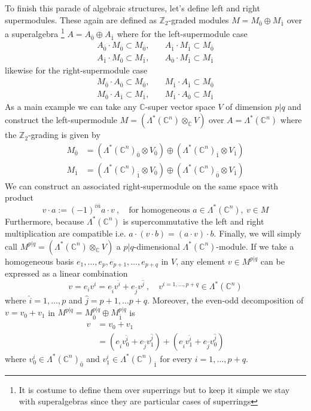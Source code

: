 \documentclass[a4paper,12pt]{article}
\numberwithin{equation}{section}
\numberwithin{thm}{section}
\numberwithin{exm}{section}
\newcommand{\Z}{{\mathbb Z}}
\newcommand{\C}{{\mathbb C}}
\newcommand{\<}{{\langle}}
\renewcommand{\>}{{\rangle}}
\renewcommand{\L}{{\Lambda}}
\begin{document}
To finish this parade of algebraic structures, let's define left and right supermodules. These again are defined as $\Z_2$-graded modules $M = M_{\bar 0}\oplus M_{\bar 1}$ over a superalgebra%
\footnote{It is costume to define them over superrings but to keep it simple we stay with superalgebras since they are particular cases of superrings}
$A = A_{\bar 0} \oplus A_{\bar 1}$ where for the left-supermodule case
	\begin{align}
	A_{\bar 0}\cdot M_{\bar 0} \subset M_{\bar 0},&\quad A_{\bar 1}\cdot M_{\bar 1}\subset M_{\bar 0} \nonumber \\
	A_{\bar 1}\cdot M_{\bar 0} \subset M_{\bar 1},&\quad A_{\bar 0}\cdot M_{\bar 1}\subset M_{\bar 1}
	\end{align}
likewise for the right-supermodule case
	\begin{align}
	M_{\bar 0}\cdot A_{\bar 0} \subset M_{\bar 0},&\quad M_{\bar 1}\cdot A_{\bar 1}\subset M_{\bar 0} \nonumber \\
	M_{\bar 0}\cdot A_{\bar 1} \subset M_{\bar 1},&\quad M_{\bar 1}\cdot A_{\bar 0}\subset M_{\bar 1}
	\end{align}
As a main example we can take any $\C$-super vector space $V$ of dimension $p|q$ and construct the left-supermodule $M = (\L^*(\C^n)\otimes_{\C} V)$ over $A = \L^*(\C^n)$ where the $\Z_2$-grading is given by
	\begin{align}
	M_{\bar 0} &= (\L^*(\C^n)_{\bar 0}\otimes V_{\bar 0}) \oplus (\L^*(\C^n)_{\bar 1} \otimes V_{\bar 1}) \\
	M_{\bar 1} &= (\L^*(\C^n)_{\bar 1}\otimes V_{\bar 0}) \oplus (\L^*(\C^n)_{\bar 0} \otimes V_{\bar 1})
	\end{align}
We can construct an associated right-supermodule on the same space with product
	\begin{equation}
	v\cdot a := (-1)^{\bar v\bar a}a\cdot v\ ,\quad\text{for homogeneous } a\in\L^*(\C^n),\ v\in M
	\end{equation}
Furthermore, because $\L^*(\C^n)$ is supercommutative the left and right multiplication are compatible i.e. $a\cdot(v\cdot b) = (a\cdot v)\cdot b$. Finally, we will simply call $M^{p|q} = (\L^*(\C^n)\otimes_\C V)$ a $p|q$-dimensional $\L^*(\C^n)$-module. If we take a homogeneous basis ${e_1,\ldots,e_p,e_{p+1},\ldots,e_{p+q}}$ in $V$, any element $v\in M^{p|q}$ can be expressed as a linear combination
	\begin{equation}
	v = e_i v^i = e_{\hat i}v^{\hat i} + e_{\hat j}v^{\hat j}\ ,\quad v^{i=1,\ldots,p+q}\in \L^*(\C^n)
	\end{equation}
where $\hat i = 1,\ldots, p$ and $\hat j = p + 1,\ldots p+q$. Moreover, the even-odd decomposition of $v = v_0 + v_1$ in $M^{p|q} = M^{p|q}_{\bar 0} \oplus M^{p|q}_{\bar 1}$ is
	\begin{align}
	v & = v_0 + v_1 \\
	& = (e_{\hat i} v^{\hat i}_0 + e_{\hat j} v^{\hat j}_1) + (e_{\hat i} v^{\hat i}_1 + e_{\hat j} v^{\hat j}_0)
	\end{align}
where $v^i_0 \in \L^*(\C^n)_{\bar 0}$ and $v^i_1 \in \L^*(\C^n)_{\bar 1}$ for every $i=1,\ldots,p+q$.
\end{document}
